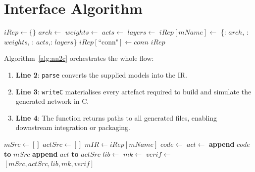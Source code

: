\section{Interface Algorithm}

\begin{algorithm}[htbp]
    \caption{Parse Models to Intermediate Representation}\label{alg:parse-c}
    \begin{algorithmic}[1]
        \State $iRep \gets \{\}$
            \State $arch \gets$ 
            \State $weights \gets$ 
            \State $acts \gets$ 
            \State $layers \gets$ 
            \State $iRep[mName] \gets$ \{: $arch$, : $weights$,%
                   : $acts$,: $layers$\}
        \EndFor
        \State $iRep[\text{``conn"}] \gets conn$
        \State \Return $iRep$
    \EndFunction
    \end{algorithmic}
\end{algorithm}

Algorithm~\ref{alg:nn2c} orchestrates the whole flow:

\begin{enumerate}
  \item \textbf{Line 2}: \texttt{parse} converts the supplied models into the IR.
  \item \textbf{Line 3}: \texttt{writeC} materialises every artefact required to build and simulate the generated network in C.
  \item \textbf{Line 4}: The function returns paths to all generated files, enabling downstream integration or packaging.
\end{enumerate}

\begin{algorithm}[htbp]
    \caption{Write C Source Files from Intermediate Representation}\label{alg:write-c}
    \begin{algorithmic}[1]
        \State $mSrc \gets []$ %
        \State $actSrc \gets []$ %
            \State $mIR \gets iRep[mName]$
            \State $code \gets$ 
            \State $act \gets$ 
            \State \textbf{append} $code$ \textbf{to} $mSrc$
            \State \textbf{append} $act$ \textbf{to} $actSrc$
        \EndFor
        \State $lib \gets$ 
        \State $mk  \gets$ 
            \State $verif \gets$ 
        \EndIf
        \State \Return $[mSrc, actSrc, lib, mk, verif]$
    \EndFunction
    \end{algorithmic}
\end{algorithm}

